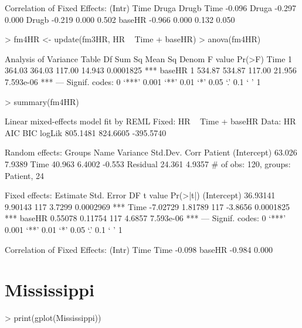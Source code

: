 \documentclass[12pt]{article}
\begin{document}
\begin{Schunk}
\begin{Soutput}
Correlation of Fixed Effects:
       (Intr) Time   Druga  Drugb 
Time   -0.096                     
Druga  -0.297  0.000              
Drugb  -0.219  0.000  0.502       
baseHR -0.966  0.000  0.132  0.050
\end{Soutput}
\begin{Sinput}
> fm4HR <- update(fm3HR, HR ~ Time + baseHR)
> anova(fm4HR)
\end{Sinput}
\begin{Soutput}
Analysis of Variance Table
       Df Sum Sq Mean Sq  Denom F value    Pr(>F)    
Time    1 364.03  364.03 117.00  14.943 0.0001825 ***
baseHR  1 534.87  534.87 117.00  21.956 7.593e-06 ***
---
Signif. codes:  0 `***' 0.001 `**' 0.01 `*' 0.05 `.' 0.1 ` ' 1 
\end{Soutput}
\begin{Sinput}
> summary(fm4HR)
\end{Sinput}
\begin{Soutput}
Linear mixed-effects model fit by REML
Fixed: HR ~ Time + baseHR 
 Data: HR 
      AIC      BIC    logLik
 805.1481 824.6605 -395.5740

Random effects:
 Groups   Name        Variance Std.Dev. Corr   
 Patient  (Intercept) 63.026   7.9389          
          Time        40.963   6.4002   -0.553 
 Residual             24.361   4.9357          
# of obs: 120, groups: Patient, 24

Fixed effects:
             Estimate Std. Error  DF t value  Pr(>|t|)    
(Intercept)  36.93141    9.90143 117  3.7299 0.0002969 ***
Time         -7.02729    1.81789 117 -3.8656 0.0001825 ***
baseHR        0.55078    0.11754 117  4.6857 7.593e-06 ***
---
Signif. codes:  0 `***' 0.001 `**' 0.01 `*' 0.05 `.' 0.1 ` ' 1 

Correlation of Fixed Effects:
       (Intr) Time  
Time   -0.098       
baseHR -0.984  0.000
\end{Soutput}
\end{Schunk}

\section{Mississippi}
\label{sec:Mississippi}
\begin{Schunk}
\begin{Sinput}
> print(gplot(Mississippi))
\end{Sinput}
\end{Schunk}
\end{document}
